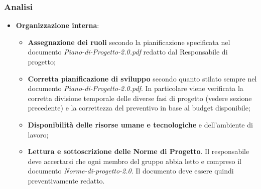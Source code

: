 \documentclass[a4paper,11pt]{article}
\begin{document}
\subsubsection{Analisi}
\begin{itemize}
\item \textbf{Organizzazione interna}:
\begin{itemize}
\item \textbf{Assegnazione dei ruoli} secondo la pianificazione specificata nel documento \textit{Piano-di-Progetto-2.0.pdf} redatto dal Responsabile di progetto;
\item \textbf{Corretta pianificazione di sviluppo} secondo quanto stilato sempre nel documento \textit{Piano-di-Progetto-2.0.pdf}. In particolare viene verificata la corretta divisione temporale delle diverse fasi di progetto (vedere sezione precedente) e la correttezza del preventivo in base al budget disponibile;
\item \textbf{Disponibilità delle risorse umane e tecnologiche} e dell'ambiente di lavoro;
\item \textbf{Lettura e sottoscrizione delle Norme di Progetto}. Il responsabile deve accertarsi che ogni membro del gruppo abbia letto e compreso il documento \textit{Norme-di-progetto-2.0}. Il documento deve essere quindi preventivamente redatto.


\end{itemize} 
 

\end{itemize}
\end{document}
